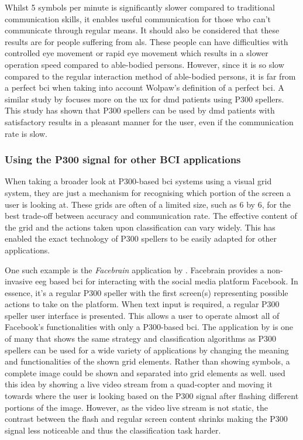 Whilst 5 symbols per minute is significantly slower compared to traditional communication skills, it enables useful communication for those who can't communicate through regular means.
It should also be considered that these results are for people suffering from \gls{als}.
These people can have difficulties with controlled eye movement or rapid eye movement which results in a slower operation speed compared to able-bodied persons.
However, since it is so slow compared to the regular interaction method of able-bodied persons, it is far from a perfect \gls{bci} when taking into account Wolpaw's definition of a perfect \gls{bci}.
A similar study by \citet{p300_speller_real_life2} focuses more on the \gls{ux} for \gls{dmd} patients using P300 spellers.
This study has shown that P300 spellers can be used by \gls{dmd} patients with satisfactory results in a pleasant manner for the user, even if the communication rate is slow.



\subsubsection{Using the P300 signal for other BCI applications}
\label{subsubsec:bci_common_use_cases_bcis_replace_eye_tracking_p300_other_applications}

When taking a broader look at P300-based \gls{bci} systems using a visual grid system, they are just a mechanism for recognising which portion of the screen a user is looking at.
These grids are often of a limited size, such as 6 by 6, for the best trade-off between accuracy and communication rate.
The effective content of the grid and the actions taken upon classification can vary widely.
This has enabled the exact technology of P300 spellers to be easily adapted for other applications.

One such example is the \textit{Facebrain} application by \citet{facebrain}.
Facebrain provides a non-invasive \gls{eeg} based \gls{bci} for interacting with the social media platform Facebook.
In essence, it's a regular P300 speller with the first screen(s) representing possible actions to take on the platform.
When text input is required, a regular P300 speller user interface is presented.
This allows a user to operate almost all of Facebook's functionalities with only a P300-based \gls{bci}.
The application by \citet{facebrain} is one of many that shows the same strategy and classification algorithms as P300 spellers can be used for a wide variety of applications by changing the meaning and functionalities of the shown grid elements.
Rather than showing symbols, a complete image could be shown and separated into grid elements as well.
 used this idea by showing a live video stream from a quad-copter and moving it towards where the user is looking based on the P300 signal after flashing different portions of the image.
However, as the video live stream is not static, the contrast between the flash and regular screen content shrinks making the P300 signal less noticeable and thus the classification task harder.

